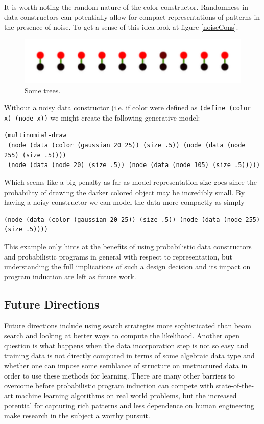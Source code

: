 \documentclass[a4paper,10pt]{article}
\begin{document}
It is worth noting the random nature of the color constructor.  Randomness in data constructors can potentially allow for compact representations of patterns in the presence of noise.  To get a sense of this idea look at figure \ref{noiseCons}. 
\begin{figure}[h]
\begin{center}
\includegraphics[scale=.60]{noisyConstructor.pdf}
\end{center}
\label{fig:noiseCons}
\caption{Some trees.}
\end{figure}
Without a noisy data constructor (i.e. if color were defined as \texttt{(define (color x) (node x))} we might create the following generative model:
\begin{lstlisting}
(multinomial-draw
 (node (data (color (gaussian 20 25)) (size .5)) (node (data (node 255) (size .5))))
 (node (data (node 20) (size .5)) (node (data (node 105) (size .5)))))
\end{lstlisting}
Which seems like a big penalty as far as model representation size goes since the probability of drawing the darker colored object may be incredibly small.  By having a noisy constructor we can model the data more compactly as simply 
\begin{lstlisting}
(node (data (color (gaussian 20 25)) (size .5)) (node (data (node 255) (size .5))))
\end{lstlisting}
This example only hints at the benefits of using probabilistic data constructors and probabilistic programs in general with respect to representation, but understanding the full implications of such a design decision and its impact on program induction are left as future work.

\subsection{Future Directions}

Future directions include using search strategies more sophisticated than beam search and looking at better ways to compute the likelihood.  Another open question is what happens when the data incorporation step is not so easy and training data is not directly computed in terms of some algebraic data type and whether one can impose some semblance of structure on unstructured data in order to use these methods for learning.  There are many other barriers to overcome before probabilistic program induction can compete with state-of-the-art machine learning algorithms on real world problems, but the increased potential for capturing rich patterns and less dependence on human engineering make research in the subject a worthy pursuit.


\end{document}
